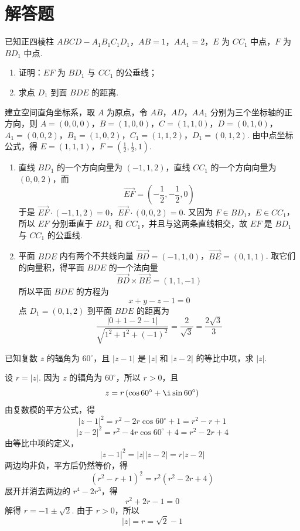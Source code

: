 \section{解答题}
\begin{problem}
已知正四棱柱 \(ABCD-A_1B_1C_1D_1\)，\(AB=1\)，\(AA_1=2\)，\(E\) 为 \(CC_1\) 中点，\(F\) 为 \(BD_1\) 中点.

\begin{enumerate}
\item 证明：\(EF\) 为 \(BD_1\) 与 \(CC_1\) 的公垂线；
\item 求点 \(D_1\) 到面 \(BDE\) 的距离.
\end{enumerate}


\begin{solution}
建立空间直角坐标系，取 \(A\) 为原点，令 \(AB\)，\(AD\)，\(AA_1\) 分别为三个坐标轴的正方向，则
\(A=(0,0,0)\)，\(B=(1,0,0)\)，\(C=(1,1,0)\)，\(D=(0,1,0)\)，\(A_1=(0,0,2)\)，\(B_1=(1,0,2)\)，\(C_1=(1,1,2)\)，\(D_1=(0,1,2)\).
由中点坐标公式，得
\(E=(1,1,1)\)，\(F=\left(\frac12,\frac12,1\right)\).

\begin{enumerate}
\item 直线 \(BD_1\) 的一个方向向量为 \((-1,1,2)\)，直线 \(CC_1\) 的一个方向向量为 \((0,0,2)\)，而
\[
\overrightarrow{EF}=\left(-\frac12,-\frac12,0\right)
\]
于是
\(\overrightarrow{EF}\cdot(-1,1,2)=0\)，\(\overrightarrow{EF}\cdot(0,0,2)=0\).
又因为 \(F\in BD_1\)，\(E\in CC_1\)，所以 \(EF\) 分别垂直于 \(BD_1\) 和 \(CC_1\)，并且与这两条直线相交，故 \(EF\) 是 \(BD_1\) 与 \(CC_1\) 的公垂线.

\item 平面 \(BDE\) 内有两个不共线向量
\(\overrightarrow{BD}=(-1,1,0)\)，\(\overrightarrow{BE}=(0,1,1)\).
取它们的向量积，得平面 \(BDE\) 的一个法向量
\[
\overrightarrow{BD}\times\overrightarrow{BE}=(1,1,-1)
\]
所以平面 \(BDE\) 的方程为
\[
x+y-z-1=0
\]
点 \(D_1=(0,1,2)\) 到平面 \(BDE\) 的距离为
\[
\frac{|0+1-2-1|}{\sqrt{1^2+1^2+(-1)^2}}
=\frac{2}{\sqrt3}=\frac{2\sqrt3}{3}
\]
\end{enumerate}
\end{solution}
\end{problem}

\begin{problem}
已知复数 \(z\) 的辐角为 \(60^{\circ}\)，且 \(|z-1|\) 是 \(|z|\) 和 \(|z-2|\) 的等比中项，求 \(|z|\).
\begin{solution}
设 \(r=|z|\). 因为 \(z\) 的辐角为 \(60^{\circ}\)，所以 \(r>0\)，且
\[
z=r\left(\cos60^{\circ}+\i\sin60^{\circ}\right)
\]
由复数模的平方公式，得
\[
|z-1|^2=r^2-2r\cos60^{\circ}+1=r^2-r+1
\]
\[
|z-2|^2=r^2-4r\cos60^{\circ}+4=r^2-2r+4
\]
由等比中项的定义，
\[
|z-1|^2=|z||z-2|=r|z-2|
\]
两边均非负，平方后仍然等价，得
\[
\left(r^2-r+1\right)^2=r^2\left(r^2-2r+4\right)
\]
展开并消去两边的 \(r^4-2r^3\)，得
\[
r^2+2r-1=0
\]
解得 \(r=-1\pm\sqrt2\). 由于 \(r>0\)，所以
\[
|z|=r=\sqrt2-1
\]
\end{solution}
\end{problem}

